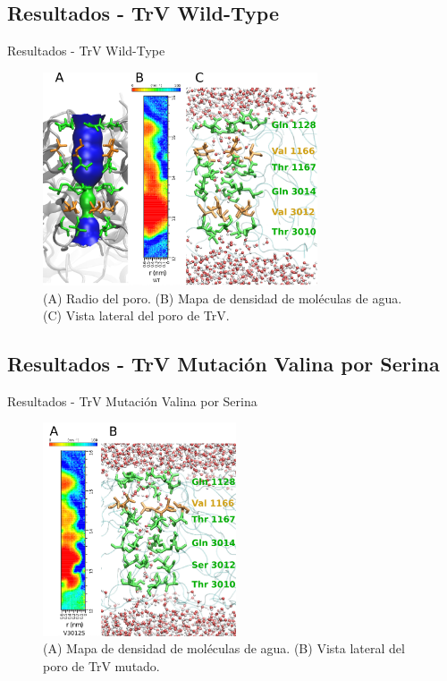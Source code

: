 \documentclass[8pt]{beamer}
\begin{document}
\subsection{Resultados - TrV Wild-Type}
\begin{frame}[t]{Resultados - TrV Wild-Type}
\begin{figure}[ht]
  \centering
    \vspace{-0.25cm}
  \includegraphics[height=6.3cm,keepaspectratio]{Figure/TrV_WT_Dens.png}
\caption*{ (A) Radio del poro. (B) Mapa de densidad de moléculas de agua. \\ (C) Vista lateral del poro de TrV.} %
\end{figure}
\end{frame}

\subsection{Resultados - TrV Mutación Valina por Serina}
\begin{frame}[t]{Resultados - TrV Mutación Valina por Serina}

\begin{figure}[ht]
  \centering
  \vspace{-0.25cm}
  \includegraphics[height=6.3cm,keepaspectratio]{Figure/TrV_VS_Dens.png}
\caption*{ (A) Mapa de densidad de moléculas de agua. (B) Vista lateral del poro de TrV mutado.}%
\end{figure}

\end{frame}
\end{document}
